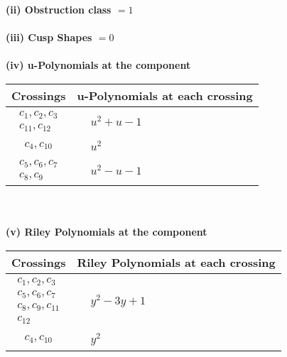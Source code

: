 \documentclass[1p]{elsarticle_modified}
\theoremstyle{definition}
\begin{document}
\flushleft \textbf{(ii) Obstruction class $= 1$}\\~\\
\flushleft \textbf{(iii) Cusp Shapes $= 0$}\\~\\
\newpage\renewcommand{\arraystretch}{1}
\flushleft \textbf{(iv) u-Polynomials at the component}\newline \\
\begin{tabular}{m{50pt}|m{274pt}}
Crossings & \hspace{64pt}u-Polynomials at each crossing \\
\hline $$\begin{aligned}c_{1},c_{2},c_{3}\\c_{11},c_{12}\end{aligned}$$&$\begin{aligned}
&u^2+u-1
\end{aligned}$\\
\hline $$\begin{aligned}c_{4},c_{10}\end{aligned}$$&$\begin{aligned}
&u^2
\end{aligned}$\\
\hline $$\begin{aligned}c_{5},c_{6},c_{7}\\c_{8},c_{9}\end{aligned}$$&$\begin{aligned}
&u^2- u-1
\end{aligned}$\\
\hline
\end{tabular}\\~\\
\newpage\renewcommand{\arraystretch}{1}
\flushleft \textbf{(v) Riley Polynomials at the component}\newline \\
\begin{tabular}{m{50pt}|m{274pt}}
Crossings & \hspace{64pt}Riley Polynomials at each crossing \\
\hline $$\begin{aligned}c_{1},c_{2},c_{3}\\c_{5},c_{6},c_{7}\\c_{8},c_{9},c_{11}\\c_{12}\end{aligned}$$&$\begin{aligned}
&y^2-3 y+1
\end{aligned}$\\
\hline $$\begin{aligned}c_{4},c_{10}\end{aligned}$$&$\begin{aligned}
&y^2
\end{aligned}$\\
\hline
\end{tabular}\\~\\
\end{document}
